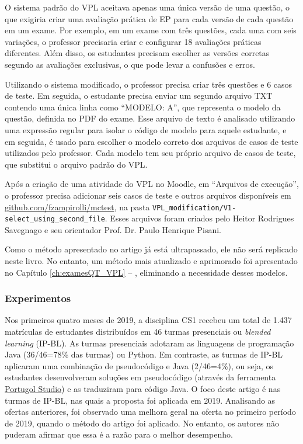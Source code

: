 O sistema padrão do VPL aceitava apenas uma única versão de uma questão, o que exigiria criar uma avaliação prática de EP para cada versão de cada questão em um exame. Por exemplo, em um exame com três questões, cada uma com seis variações, o professor precisaria criar e configurar 18 avaliações práticas diferentes. Além disso, os estudantes precisam escolher as versões corretas segundo as avaliações exclusivas, o que pode levar a confusões e erros.

Utilizando o sistema modificado, o professor precisa criar três questões e 6 casos de teste. Em seguida, o estudante precisa enviar um segundo arquivo TXT contendo uma única linha como ``MODELO: A'', que representa o modelo da questão, definida no PDF do exame. Esse arquivo de texto é analisado utilizando uma expressão regular para isolar o código de modelo para aquele estudante, e em seguida, é usado para escolher o modelo correto dos arquivos de casos de teste utilizados pelo professor. Cada modelo tem seu próprio arquivo de casos de teste, que substitui o arquivo padrão do VPL.

Após a criação de uma atividade do VPL no Moodle, em ``Arquivos de execução'', o professor precisa adicionar seis casos de teste e outros arquivos disponíveis em \href{https://github.com/fzampirolli/mctest}{github.com/fzampirolli/mctest}, na pasta \verb|VPL_modification/V1-select_using_second_file|. Esses arquivos foram criados pelo Heitor Rodrigues Savegnago e seu orientador Prof. Dr. Paulo Henrique Pisani.

Como o método apresentado no artigo já está ultrapassado, ele não será replicado neste livro. No entanto, um método mais atualizado e aprimorado foi apresentado no Capítulo \ref{ch:examesQT_VPL} -- , eliminando a necessidade desses modelos.

\subsubsection{Experimentos}

Nos primeiros quatro meses de 2019, a disciplina CS1 recebeu um total de 1.437 matrículas de estudantes distribuídos em 46 turmas presenciais ou \textit{blended learning} (IP-BL). As turmas presenciais adotaram as linguagens de programação Java (36/46=78\% das turmas) ou Python. Em contraste, as turmas de IP-BL aplicaram uma combinação de pseudocódigo e Java (2/46=4\%), ou seja, os estudantes desenvolveram soluções em pseudocódigo (através da ferramenta \href{https://univali-lite.github.io/Portugol-Studio/}{Portugol Studio}) e as traduziram  para código Java. O foco deste artigo é nas turmas de IP-BL, nas quais a proposta foi aplicada em 2019. Analisando as ofertas anteriores, foi observado uma melhora geral na oferta no primeiro período de 2019, quando o método do artigo foi aplicado. No entanto, os autores não puderam afirmar que essa é a razão para o melhor desempenho.

